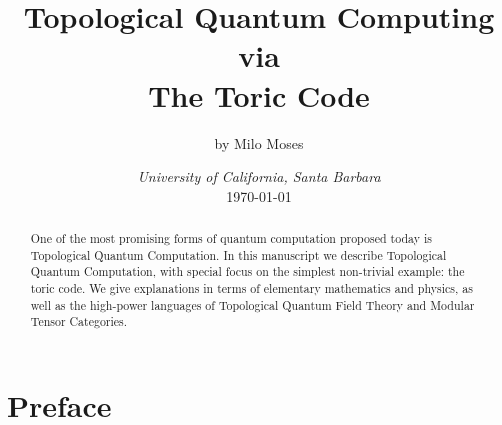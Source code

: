 \documentclass{article}
\title{Topological Quantum Computing\\ via \\ The Toric Code}
\author{by Milo Moses}
\date{\textit{University of California, Santa Barbara} \\ [2ex] \today}
\theoremstyle{definition}
\numberwithin{figure}{section}
\begin{document}
\maketitle

\newcommand{\RR}{\mathbb{R}}
\newcommand{\HH}{\mathbb{H}}
\newcommand{\NN}{\mathbb{N}}
\newcommand{\QQ}{\mathbb{Q}}
\newcommand{\CC}{\mathbb{C}}
\newcommand{\FF}{\mathbb{F}}
\newcommand{\ZZ}{\mathbb{Z}}
\newcommand{\Zcal}{\mathcal{Z}}
\newcommand{\Ncal}{\mathcal{N}}
\newcommand{\LL}{\mathscr{L}}
\newcommand{\TT}{\mathcal{T}}
\newcommand{\Ccat}{\mathscr{C}}
\newcommand{\Dcat}{\mathscr{D}}
\newcommand{\Ecat}{\mathscr{E}}
\newcommand{\st}{\,\,\mathrm{s.t}\,\,}
\newcommand{\mm}{\mathfrak{m}}
\newcommand{\pp}{\mathfrak{p}}
\newcommand{\Hom}{\mathrm{Hom}}
\newcommand{\Aut}{\mathrm{Aut}}
\newcommand{\Frac}{\mathrm{Frac}}
\newcommand{\tr}{\mathrm{tr}}
\newcommand{\op}{\mathrm{op}}
\newcommand{\res}{\mathrm{res}}
\newcommand{\im}{\mathrm{im}}
\newcommand{\ev}{\mathrm{ev}}
\newcommand{\coev}{\mathrm{coev}}
\newcommand{\id}{\mathrm{id}}
\newcommand{\coker}{\mathrm{coker}}
\newcommand{\SL}{\mathrm{SL}}
\newcommand{\End}{\mathrm{End}}
\newcommand{\Rep}{\bold{Rep}}
\newcommand{\Set}{\bold{Set}}
\newcommand{\Vecc}{\bold{Vec}}
\newcommand{\Top}{\bold{Top}}
\newcommand{\Grp}{\bold{Grp}}
\newcommand{\Hilb}{\bold{Hilb}}
\newcommand{\Bord}{\bold{Bord}}
\newcommand{\Cat}{\bold{Cat}}
\newcommand{\0}{\left|0\right>}
\newcommand{\1}{\left|1\right>}
\newcommand{\nullclass}{\left|\bold{0}\right>}
\newcommand{\alphaclass}{\left|\alpha\right>}
\newcommand{\betaclass}{\left|\beta\right>}
\newcommand{\alphabetaclass}{\left|\alpha\beta\right>}
\newcommand{\ppsi}{\left|\psi\right>}
\newcommand{\bigleadsto}{\mathlarger{\mathlarger{\mathlarger{\leadsto}}}}
\newcommand{\vin}{\rotatebox[origin=c]{-90}{$\in$}}


\begin{abstract}
One of the most promising forms of quantum computation proposed today is Topological Quantum Computation. In this manuscript we describe Topological Quantum Computation, with special focus on the simplest non-trivial example: the toric code. We give explanations in terms of elementary mathematics and physics, as well as the high-power languages of Topological Quantum Field Theory and Modular Tensor Categories.
\end{abstract}

\newpage

\tableofcontents

\newpage

\section{Preface}
\label{Preface}
\end{document}
